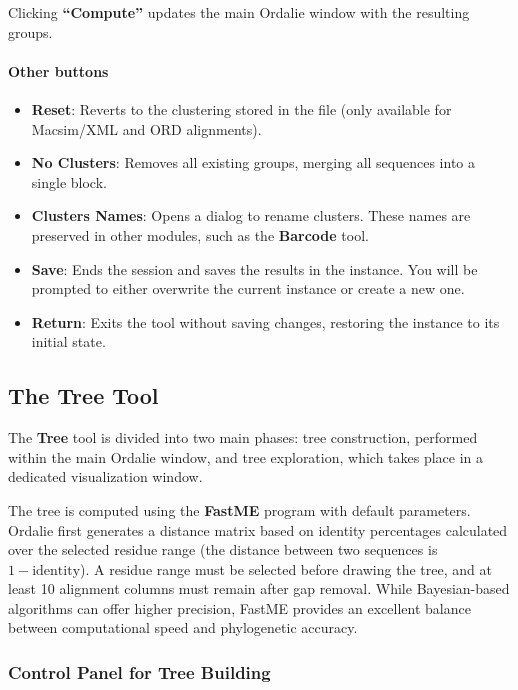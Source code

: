 \documentclass[a4paper]{article}
\begin{document}
Clicking \textbf{``Compute''} updates the main Ordalie window with the resulting groups.

\paragraph{Other buttons}
\begin{itemize}
    \item \textbf{Reset}: Reverts to the clustering stored in the file (only available for Macsim/XML and ORD alignments).
    \item \textbf{No Clusters}: Removes all existing groups, merging all sequences into a single block.
    \item \textbf{Clusters Names}: Opens a dialog to rename clusters. These names are preserved in other modules, such as the \textbf{Barcode} tool.
    \item \textbf{Save}: Ends the session and saves the results in the instance. You will be prompted to either overwrite the current instance or create a new one.
    \item \textbf{Return}: Exits the tool without saving changes, restoring the instance to its initial state.
\end{itemize}

\subsection{The Tree Tool}
\label{chap-tree}
\label{tool-tree}

The \textbf{Tree} tool is divided into two main phases: tree construction, performed within the main Ordalie window, and tree exploration, which takes place in a dedicated visualization window.

The tree is computed using the \textbf{FastME} program \cite{soft:fastme} with default parameters. Ordalie first generates a distance matrix based on identity percentages calculated over the selected residue range (the distance between two sequences is $1 - \mathrm{identity}$). A residue range must be selected before drawing the tree, and at least 10 alignment columns must remain after gap removal. While Bayesian-based algorithms can offer higher precision, FastME provides an excellent balance between computational speed and phylogenetic accuracy.

\subsubsection{Control Panel for Tree Building}
\label{control-tree}
\end{document}
